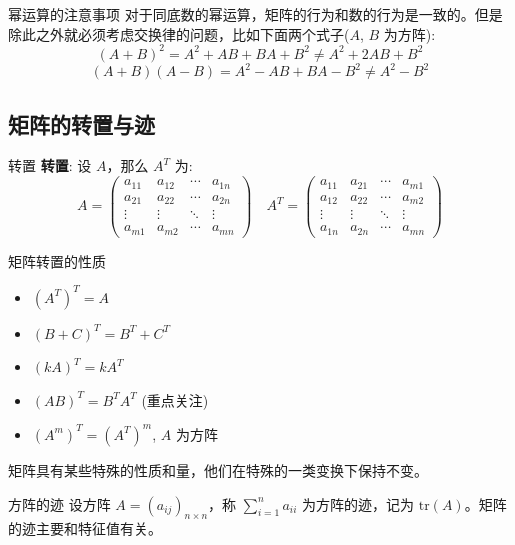 \documentclass[a4paper,12pt]{ctexart}
\begin{document}
\newpage

\begin{myprop}{幂运算的注意事项}{}
    对于同底数的幂运算，矩阵的行为和数的行为是一致的。但是除此之外就必须考虑交换律的问题，比如下面两个式子($A$, $B$ 为方阵):
    \[
    (A+B)^2 = A^2 + AB + BA + B^2 \neq A^2 +2AB + B^2
    \]
    \[
    (A+B)(A-B) = A^2 - AB + BA - B^2 \neq A^2 - B^2
    \]
\end{myprop}

\subsection{矩阵的转置与迹}

\begin{mydef}{转置}{}
    \textbf{转置}: 设 $A$，那么 $A^T$ 为:
    \[
    A=
    \begin{pmatrix}
    a_{11} & a_{12} & \cdots & a_{1n} \\
    a_{21} & a_{22} & \cdots & a_{2n} \\
    \vdots & \vdots & \ddots & \vdots \\
    a_{m1} & a_{m2} & \cdots & a_{mn}
    \end{pmatrix} 
    \quad A^T =
    \begin{pmatrix}
    a_{11} & a_{21} & \cdots & a_{m1} \\
    a_{12} & a_{22} & \cdots & a_{m2} \\
    \vdots & \vdots & \ddots & \vdots \\
    a_{1n} & a_{2n} & \cdots & a_{mn}
    \end{pmatrix}
    \]
\end{mydef}
    
\begin{myprop}{矩阵转置的性质}{}
    \begin{itemize}
        \item $(A^T)^T = A$
        \item $(B+C)^T = B^T + C^T$
        \item $(kA)^T = k A^T$
        \item $(AB)^T = B^TA^T$ (重点关注)
        \item $(A^m)^T = (A^T)^m$, $A$ 为方阵
    \end{itemize}
\end{myprop}

矩阵具有某些特殊的性质和量，他们在特殊的一类变换下保持不变。

\begin{mydef}{方阵的迹}{}
        设方阵 $A = (a_{ij})_{n \times n}$，称 $\sum_{i=1}^{n}a_{ii}$ 为方阵的迹，记为 $\mathrm{tr}(A)$。矩阵的迹主要和特征值有关。
    \end{mydef}
\end{document}
